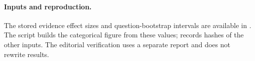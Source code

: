 \documentclass[11pt,a4paper]{article}
\begin{document}
\paragraph{Inputs and reproduction.}
The stored evidence effect sizes and question-bootstrap intervals are available in
. The script
 builds the categorical figure from these values;
 records hashes of the other inputs. The editorial verification
uses a separate report and does not rewrite results.
\end{document}
